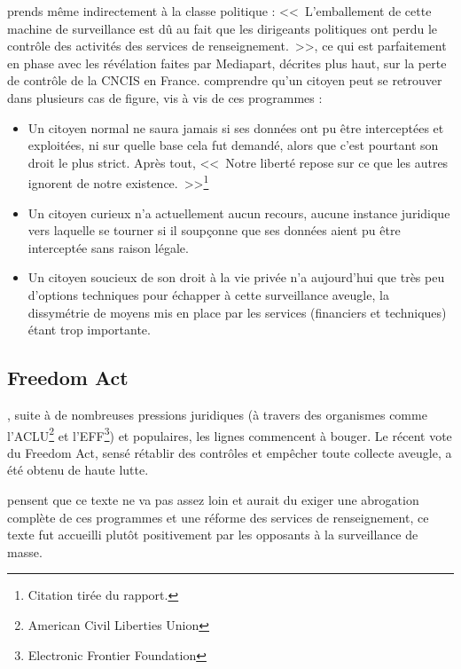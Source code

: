  prends même indirectement à la classe politique :
<<~L'emballement de cette machine de surveillance est dû au fait que les
dirigeants politiques ont perdu le contrôle des activités des services de
renseignement.~>>, ce qui est parfaitement en phase avec les révélation faites
par Mediapart, décrites plus haut, sur la perte de contrôle de la CNCIS en
France.
\newpage
{} comprendre qu'un citoyen peut se retrouver dans
plusieurs cas de figure, vis à vis de ces programmes :

\begin{itemize}
  \item Un citoyen normal ne saura jamais si ses données ont pu être
  interceptées et exploitées, ni sur quelle base cela fut demandé, alors que
  c'est pourtant son droit le plus strict. Après tout, <<~Notre liberté repose
  sur ce que les autres ignorent de notre existence.~>>\footnote{Citation tirée
  du rapport.}
  \item Un citoyen curieux n'a actuellement aucun recours, aucune instance
  juridique vers laquelle se tourner si il soupçonne que ses données aient pu
  être interceptée sans raison légale.
  \item Un citoyen soucieux de son droit à la vie privée n'a aujourd'hui que
  très peu d'options techniques pour échapper à cette surveillance aveugle, la
  dissymétrie de moyens mis en place par les services (financiers et techniques)
  étant trop importante.
\end{itemize}

\subsection{Freedom Act}

, suite à de nombreuses pressions juridiques (à travers des
organismes comme l'ACLU\footnote{American Civil Liberties Union} et
l'EFF\footnote{Electronic Frontier Foundation}) et populaires, les lignes
commencent à bouger. Le récent vote du Freedom Act, sensé rétablir des contrôles
et empêcher toute collecte aveugle, a été obtenu de haute
lutte\cite{freedom}.

 pensent que ce texte ne va pas assez loin et
aurait du exiger une abrogation complète de ces programmes et une réforme des services de
renseignement, ce texte fut accueilli plutôt positivement par les opposants à la
surveillance de masse.


